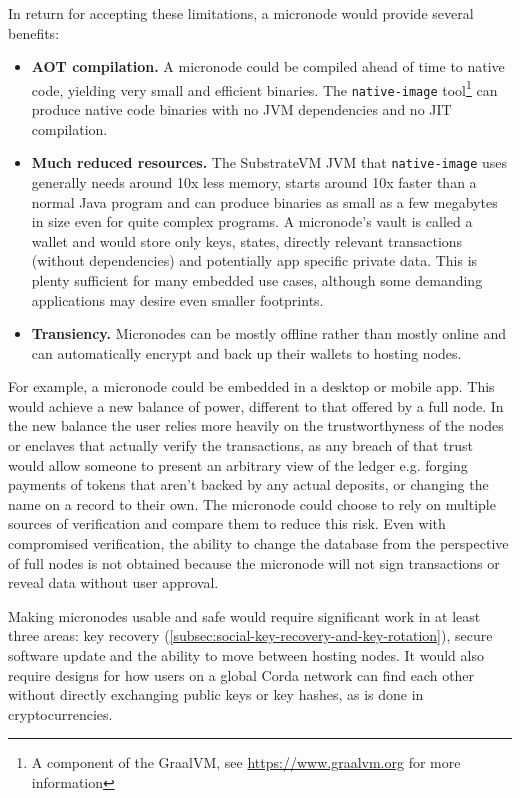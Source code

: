 \documentclass{article}
\begin{document}
In return for accepting these limitations, a micronode would provide several benefits:

\begin{itemize}

    \item \textbf{AOT compilation.} A micronode could be compiled ahead of time to native code, yielding very small
    and efficient binaries. The \texttt{native-image} tool\footnote{A component of the GraalVM, see
    \href{https://www.graalvm.org}{https://www.graalvm.org} for more information} can produce native code
    binaries with no JVM dependencies and no JIT compilation.

    \item \textbf{Much reduced resources.} The SubstrateVM JVM that \texttt{native-image} uses generally needs
    around 10x less memory, starts around 10x faster than a normal Java program and can produce binaries as small
    as a few megabytes in size even for quite complex programs. A micronode's vault is called a wallet and would
    store only keys, states, directly relevant transactions (without dependencies) and potentially app specific
    private data. This is plenty sufficient for many embedded use cases, although some demanding applications may
    desire even smaller footprints.

    \item \textbf{Transiency.} Micronodes can be mostly offline rather than mostly online and can automatically
    encrypt and back up their wallets to hosting nodes.

\end{itemize}

For example, a micronode could be embedded in a desktop or mobile app. This would achieve a new balance of power,
different to that offered by a full node. In the new balance the user relies more heavily on the trustworthyness of
the nodes or enclaves that actually verify the transactions, as any breach of that trust would allow someone to
present an arbitrary view of the ledger e.g. forging payments of tokens that aren't backed by any actual deposits,
or changing the name on a record to their own. The micronode could choose to rely on multiple sources of
verification and compare them to reduce this risk. Even with compromised verification, the ability to change the
database from the perspective of full nodes is not obtained because the micronode will not sign transactions or
reveal data without user approval.

Making micronodes usable and safe would require significant work in at least three areas: key recovery
(\cref{subsec:social-key-recovery-and-key-rotation}), secure software update and the ability to move between
hosting nodes. It would also require designs for how users on a global Corda network can find each other
without directly exchanging public keys or key hashes, as is done in cryptocurrencies.
\end{document}
